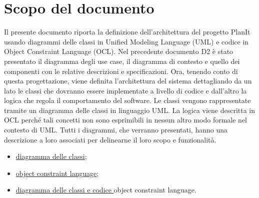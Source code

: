 \section*{Scopo del documento}
Il presente documento riporta la definizione dell’architettura del progetto PlanIt usando diagrammi delle classi in Unified Modeling Language (UML) e codice in Object Constraint Language (OCL). Nel precedente documento D2 è stato presentato il diagramma degli use case, il diagramma di contesto e quello dei componenti con le relative descrizioni e specificazioni. Ora, tenendo conto di questa progettazione, viene definita l’architettura del sistema dettagliando da un lato le classi che dovranno essere implementate a livello di codice e dall’altro la logica che regola il comportamento del software. Le classi vengono rappresentate tramite un diagramma delle classi in linguaggio UML. La logica viene descritta in OCL perché tali concetti non sono esprimibili in nessun altro modo formale nel contesto di UML. Tutti i diagrammi, che verranno presentati, hanno una descrizione a loro associati per delinearne il loro scopo e funzionalità.

\begin{itemize}
    \item \hyperref[secD3:DiagrammaDelleClassi]{diagramma delle classi};
    \item \hyperref[secD3:ObjectConstraintLanguage]{object constraint language};
    \item \hyperref[secD3:DiagrammaECodiceObjectConstraintLanguage]{diagramma delle classi e codice }object constraint language.
\end{itemize}

